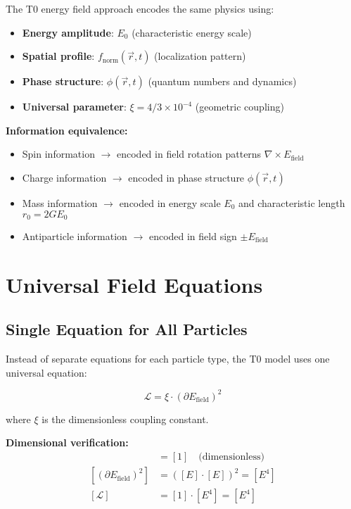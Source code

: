 \documentclass[12pt,a4paper]{report}
\begin{document}
The T0 energy field approach encodes the same physics using:
\begin{itemize}
	\item \textbf{Energy amplitude}: $E_0$ (characteristic energy scale)
	\item \textbf{Spatial profile}: $f_{\text{norm}}(\vec{r}, t)$ (localization pattern)
	\item \textbf{Phase structure}: $\phi(\vec{r}, t)$ (quantum numbers and dynamics)
	\item \textbf{Universal parameter}: $\xi = 4/3 \times 10^{-4}$ (geometric coupling)
\end{itemize}

\textbf{Information equivalence:}
\begin{itemize}
	\item Spin information $\rightarrow$ encoded in field rotation patterns $\nabla \times E_{\text{field}}$
	\item Charge information $\rightarrow$ encoded in phase structure $\phi(\vec{r}, t)$  
	\item Mass information $\rightarrow$ encoded in energy scale $E_0$ and characteristic length $r_0 = 2GE_0$
	\item Antiparticle information $\rightarrow$ encoded in field sign $\pm E_{\text{field}}$
\end{itemize}

\section{Universal Field Equations}
\label{sec:universal_equations}

\subsection{Single Equation for All Particles}
\label{subsec:single_equation}

Instead of separate equations for each particle type, the T0 model uses one universal equation:

\begin{equation}
	\boxed{\mathcal{L} = \xi \cdot (\partial E_{\text{field}})^2}
	\label{eq:universal_lagrangian}
\end{equation}

where $\xi$ is the dimensionless coupling constant.

\textbf{Dimensional verification:}
\begin{align}
	[\xi] &= [1] \quad \text{(dimensionless)} \\
	[(\partial E_{\text{field}})^2] &= ([E] \cdot [E])^2 = [E^4] \\
	[\mathcal{L}] &= [1] \cdot [E^4] = [E^4]
\end{align}
\end{document}
